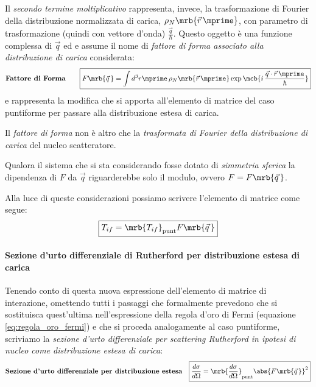 Il \textit{secondo termine moltiplicativo} rappresenta, invece, la
trasformazione di Fourier della distribuzione normalizzata di carica,
$\rho_N\mrb{\vec{r}\,\mprime}$, con parametro di trasformazione (quindi con
vettore d'onda) $\frac{\vec{q}}{\hbar}$. Questo oggetto è una funzione
complessa di $\vec{q}$ ed e assume il nome di \textit{fattore di forma
	associato alla distribuzione di carica} considerata:
\begin{align}
	\textbf{Fattore di Forma}
	\qquad
	\boxed{
		F\mrb{\vec{q}\,} = \int d^3r\mprime \, \rho_N\mrb{\vec{r}\,\mprime}
		\exp\mcb{i \, \frac{\vec{q} \cdot \vec{r}\,\mprime}{\hbar}}
	}
\end{align}
e rappresenta la modifica che si apporta all'elemento di matrice del caso
puntiforme per passare alla distribuzione estesa di carica.\\
\begin{note}[]
	Il \textit{fattore di forma} non è altro che la \textit{trasformata di
		Fourier della distribuzione di carica} del nucleo scatteratore.
\end{note}
\begin{note}[]
	Qualora il sistema che si sta considerando fosse dotato di \textit{simmetria
		sferica} la dipendenza di $F$ da $\vec{q}$ riguarderebbe solo il modulo,
	ovvero $F = F\mrb{\vec{q}\,}$.
\end{note}

Alla luce di queste considerazioni possiamo scrivere l'elemento di matrice come segue:
\begin{equation}
	\boxed{
		T_{if} = \mrb{T_{if}}_\text{punt} F\mrb{\vec{q}\,}
	}
\end{equation}

\paragraph{Sezione d'urto differenziale di Rutherford per distribuzione estesa
	di carica}
Tenendo conto di questa nuova espressione dell'elemento di matrice di interazione, omettendo tutti i passaggi che formalmente prevedono che si sostituisca quest'ultima nell'espressione della regola d'oro di Fermi (equazione \ref{eq:regola_oro_fermi}) e che si proceda analogamente al caso puntiforme, scriviamo la \textit{sezione d'urto differenziale per scattering Rutherford in ipotesi di nucleo come distribuzione estesa di carica}:
\begin{align}
	\textbf{Sezione d'urto differenziale per distribuzione estesa} &  &
	\boxed{
		\frac{d\sigma}{d\Omega} = \mrb{\frac{d\sigma}{d\Omega}}_\text{punt}
		\abs{F\mrb{\vec{q}\,}}^2
	}
\end{align}

